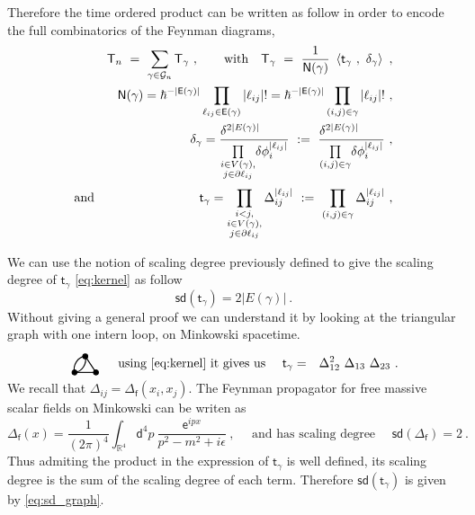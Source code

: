 \documentclass[11pt]{book}
\newcommand{\sd}{\mathsf{sd}}
\newcommand{\abs}[1]{\left|#1\right|}
\newcommand{\sm}[1]{\left\langle#1\right\rangle}
\newcommand{\Gcal}{\mathcal{G}}
\newcommand{\Rbb}{\mathbb{R}}
\newcommand{\Esf}{\mathsf{E}}
\newcommand{\Nsf}{\mathsf{N}}
\newcommand{\Tsf}{\mathsf{T}}
\newcommand{\dsf}{\mathsf{d}}
\newcommand{\esf}{\mathsf{e}}
\newcommand{\fsf}{\mathsf{f}}
\newcommand{\tsf}{\mathsf{t}}
\theoremstyle{break}
\newcommand{\FtwoGoneHoneF}{\begin{tikzpicture}[thick,scale=1.5]
\useasboundingbox (-0.1,0.1) rectangle (0.5,0.4);
\filldraw (0,0) circle (1.3pt);
\filldraw (0.4,0) circle (1.3pt);
\filldraw (0.2,0.3) circle (1.3pt);
\draw (0,0) edge [out=105,in=185] node[above] {} (0.2,0.3);
\draw (0,0) edge [out=5,in=-75] node[above] {} (0.2,0.3);
\draw (0.4,0) -- (0.2,0.3);
\draw (0.4,0) -- (0,0);
\end{tikzpicture} }
\begin{document}
Therefore the time ordered product can be written as follow in order to encode the full combinatorics of the Feynman diagrams,
%
\begin{eqnarray}
&& \Tsf_n \ = \ \sum_{\gamma \in \Gcal_n} \Tsf_\gamma \ , \qquad \mbox{with} \quad \Tsf_\gamma \ = \ \frac{1}{\Nsf(\gamma)} \ \sm{\tsf_\gamma \ , \ \delta_\gamma} \ ,
\label{eq:time_ordered_prod_graph} 
\\
%
&& \Nsf(\gamma) = \hbar^{-\abs{\Esf(\gamma)}} \prod_{\ell_{ij}\in\Esf(\gamma)} \abs{\ell_{ij}} ! = \hbar^{-\abs{\Esf(\gamma)}} \prod_{(i,j) \in \gamma} \abs{\ell_{ij}} ! \ , \nonumber \\
%
&& \delta_\gamma = \frac{\delta^{2\abs{E(\gamma)}}\hfill}{\underset{\substack{i \in V(\gamma), \\ j \in \partial \ell_{ij}}}{\prod} \delta \phi_i^{\abs{\ell_{ij}}}} \ := \ \frac{\delta^{2\abs{E(\gamma)}}\hfill}{\underset{(i,j)\in\gamma}{\prod} \delta \phi_i^{\abs{\ell_{ij}}}} \ , \nonumber \\[2pt]
%
\mbox{and} &&\tsf_\gamma = \prod_{\substack{i < j, \\ i \in V(\gamma), \\ j \in \partial \ell_{ij}}} \Delta_{ij}^{\abs{\ell_{ij}}} \ := \ \prod_{(i,j)\in\gamma} \Delta_{ij}^{\abs{\ell_{ij}}} \ , 
%
\label{eq:kernel}
\end{eqnarray}



We can use the notion of scaling degree previously defined to give the scaling degree of $\tsf_\gamma$ \eqref{eq:kernel} as follow
%
\begin{equation}
\sd(\tsf_\gamma) = 2 \abs{E(\gamma)} \ . 
\label{eq:sd_graph}
\end{equation}
%
Without giving a general proof we can understand it by looking at the triangular graph with one intern loop, on Minkowski spacetime. 
%
\begin{eqnarray*}
\FtwoGoneHoneF \quad \mbox{ using \eqref{eq:kernel} it gives us } \quad \tsf_\gamma &=& \Delta_{12}^2 \ \Delta_{13} \ \Delta_{23} \  . 
\end{eqnarray*}
% 
We recall that $\Delta_{ij}=\Delta_\fsf(x_i,x_j)$. The Feynman propagator for free massive scalar fields on Minkowski can be writen as
%
\begin{equation*}
\Delta_\fsf(x) = \frac{1}{\left(2\pi\right)^4} \int_{\Rbb^4} \dsf^4p \ \frac{\esf^{ipx}}{p^2 - m^2 + i \epsilon} \ , \quad \mbox{ and has scaling degree } \quad \sd(\Delta_\fsf) = 2 \ .
\end{equation*}
%
Thus admiting the product in the expression of $\tsf_\gamma$ is well defined, its scaling degree is the sum of the scaling degree of each term. Therefore $\sd(\tsf_\gamma)$ is given by \eqref{eq:sd_graph}. 
\end{document}
